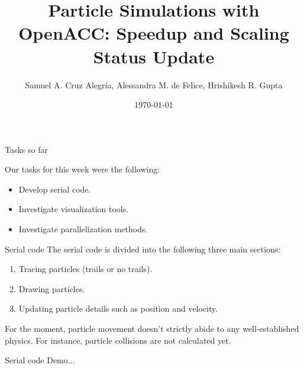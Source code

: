 \documentclass[aspectratio=169]{beamer}
\title[Particle Simulations with OpenACC]{\textbf{Particle Simulations with OpenACC: Speedup and Scaling}\\[0.5em] Status Update}
\author{Samuel A. Cruz Alegr\'{i}a, Alessandra M. de Felice, Hrishikesh R. Gupta}
\institute{(University of Lugano)}
\date{\today}
\begin{document}
\begin{frame}
\titlepage
\end{frame}

\begin{frame}[fragile]{Tasks so far}

Our tasks for this week were the following:
%
\begin{itemize}
	\item Develop serial code.
	\item Investigate visualization tools.
	\item Investigate parallelization methods.
\end{itemize}
%

\end{frame}

\begin{frame}[fragile]{Serial code}
	The serial code is divided into the following three main sections:
	\begin{enumerate}
		\item Tracing particles (trails or no trails).
		\item Drawing particles.
		\item Updating particle details such as position and velocity.
	\end{enumerate}
	
	For the moment, particle movement doesn't strictly abide to any well-established physics. For instance, particle collisions are not calculated yet.
\end{frame}

\begin{frame}[fragile]{Serial code}
	Demo...
\end{frame}
\end{document}
